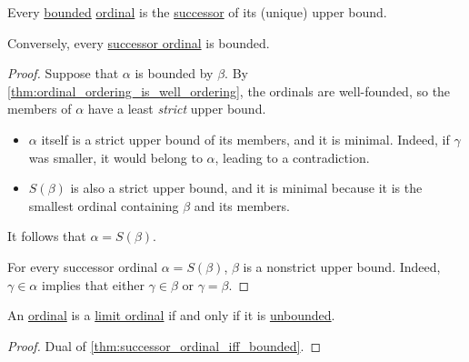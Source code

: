 \begin{proposition}\label{thm:successor_ordinal_iff_bounded}
  Every \hyperref[def:extremal_points/bounds]{bounded} \hyperref[def:ordinal]{ordinal} is the \hyperref[def:ordinal_successor]{successor} of its (unique) upper bound.

  Conversely, every \hyperref[def:successor_and_limit_ordinal]{successor ordinal} is bounded.
\end{proposition}
\begin{proof}
  \SufficiencySubProof Suppose that \( \alpha \) is bounded by \( \beta \). By \cref{thm:ordinal_ordering_is_well_ordering}, the ordinals are well-founded, so the members of \( \alpha \) have a least \emph{strict} upper bound.
  \begin{itemize}
    \item \( \alpha \) itself is a strict upper bound of its members, and it is minimal. Indeed, if \( \gamma \) was smaller, it would belong to \( \alpha \), leading to a contradiction.

    \item \( S(\beta) \) is also a strict upper bound, and it is minimal because it is the smallest ordinal containing \( \beta \) and its members.
  \end{itemize}

  It follows that \( \alpha = S(\beta) \).

  \NecessitySubProof For every successor ordinal \( \alpha = S(\beta) \), \( \beta \) is a nonstrict upper bound. Indeed, \( \gamma \in \alpha \) implies that either \( \gamma \in \beta \) or \( \gamma = \beta \).
\end{proof}

\begin{corollary}\label{thm:limit_ordinal_iff_unbounded}
  An \hyperref[def:ordinal]{ordinal} is a \hyperref[def:ordinal_successor]{limit ordinal} if and only if it is \hyperref[def:extremal_points/bounds]{unbounded}.
\end{corollary}
\begin{proof}
  Dual of \cref{thm:successor_ordinal_iff_bounded}.
\end{proof}

